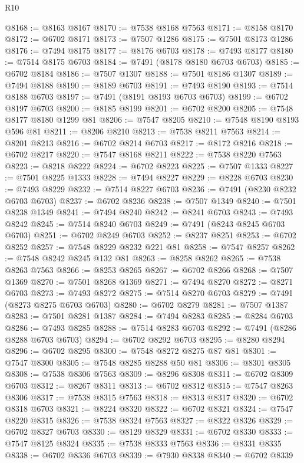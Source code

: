 \begin{lexlean}{R10}
\begin{coremodule}
@8168 := @8163 @8167
@8170 := @7538 @8168 @7563
@8171 := @8158 @8170
@8172 := @6702 @8171
@8173 := @7507 @1286
@8175 := @7501 @8173 @1286
@8176 := @7494 @8175
@8177 := @8176 @6703
@8178 := @7493 @8177
@8180 := @7514 @8175 @6703
@8184 := @7491 (@8178 @8180 @6703 @6703)
@8185 := @6702 @8184
@8186 := @7507 @1307
@8188 := @7501 @8186 @1307
@8189 := @7494 @8188
@8190 := @8189 @6703
@8191 := @7493 @8190
@8193 := @7514 @8188 @6703
@8197 := @7491 (@8191 @8193 @6703 @6703)
@8199 := @6702 @8197 @6703
@8200 := @8185 @8199
@8201 := @6702 @8200
@8205 := @7548 @8177 @8180 @1299 @81
@8206 := @7547 @8205
@8210 := @7548 @8190 @8193 @596 @81
@8211 := @8206 @8210
@8213 := @7538 @8211 @7563
@8214 := @8201 @8213
@8216 := @6702 @8214 @6703
@8217 := @8172 @8216
@8218 := @6702 @8217
@8220 := @7547 @8168 @8211
@8222 := @7538 @8220 @7563
@8223 := @8218 @8222
@8224 := @6702 @8223
@8225 := @7507 @1333
@8227 := @7501 @8225 @1333
@8228 := @7494 @8227
@8229 := @8228 @6703
@8230 := @7493 @8229
@8232 := @7514 @8227 @6703
@8236 := @7491 (@8230 @8232 @6703 @6703)
@8237 := @6702 @8236
@8238 := @7507 @1349
@8240 := @7501 @8238 @1349
@8241 := @7494 @8240
@8242 := @8241 @6703
@8243 := @7493 @8242
@8245 := @7514 @8240 @6703
@8249 := @7491 (@8243 @8245 @6703 @6703)
@8251 := @6702 @8249 @6703
@8252 := @8237 @8251
@8253 := @6702 @8252
@8257 := @7548 @8229 @8232 @221 @81
@8258 := @7547 @8257
@8262 := @7548 @8242 @8245 @132 @81
@8263 := @8258 @8262
@8265 := @7538 @8263 @7563
@8266 := @8253 @8265
@8267 := @6702 @8266
@8268 := @7507 @1369
@8270 := @7501 @8268 @1369
@8271 := @7494 @8270
@8272 := @8271 @6703
@8273 := @7493 @8272
@8275 := @7514 @8270 @6703
@8279 := @7491 (@8273 @8275 @6703 @6703)
@8280 := @6702 @8279
@8281 := @7507 @1387
@8283 := @7501 @8281 @1387
@8284 := @7494 @8283
@8285 := @8284 @6703
@8286 := @7493 @8285
@8288 := @7514 @8283 @6703
@8292 := @7491 (@8286 @8288 @6703 @6703)
@8294 := @6702 @8292 @6703
@8295 := @8280 @8294
@8296 := @6702 @8295
@8300 := @7548 @8272 @8275 @87 @81
@8301 := @7547 @8300
@8305 := @7548 @8285 @8288 @50 @81
@8306 := @8301 @8305
@8308 := @7538 @8306 @7563
@8309 := @8296 @8308
@8311 := @6702 @8309 @6703
@8312 := @8267 @8311
@8313 := @6702 @8312
@8315 := @7547 @8263 @8306
@8317 := @7538 @8315 @7563
@8318 := @8313 @8317
@8320 := @6702 @8318 @6703
@8321 := @8224 @8320
@8322 := @6702 @8321
@8324 := @7547 @8220 @8315
@8326 := @7538 @8324 @7563
@8327 := @8322 @8326
@8329 := @6702 @8327 @6703
@8330 := @8129 @8329
@8331 := @6702 @8330
@8333 := @7547 @8125 @8324
@8335 := @7538 @8333 @7563
@8336 := @8331 @8335
@8338 := @6702 @8336 @6703
@8339 := @7930 @8338
@8340 := @6702 @8339

\end{coremodule}
\end{lexlean}
